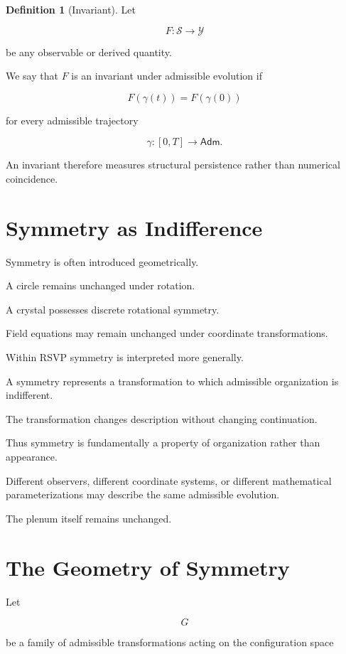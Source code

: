 \documentclass[11pt,oneside]{book}
\numberwithin{equation}{chapter}
\theoremstyle{definition}
\newtheorem{definition}{Definition}[chapter]
\theoremstyle{plain}
\newcommand{\State}{\mathcal{S}}
\newcommand{\Adm}{\mathsf{Adm}}
\begin{document}
\begin{definition}[Invariant]

Let

\[
F:\State\rightarrow\mathcal{Y}
\]

be any observable or derived quantity.

We say that \(F\) is an invariant under admissible evolution if

\[
F(\gamma(t))
=
F(\gamma(0))
\]

for every admissible trajectory

\[
\gamma:[0,T]\rightarrow\Adm.
\]

\end{definition}

An invariant therefore measures structural persistence rather than numerical
coincidence.

\section{Symmetry as Indifference}

Symmetry is often introduced geometrically.

A circle remains unchanged under rotation.

A crystal possesses discrete rotational symmetry.

Field equations may remain unchanged under coordinate transformations.

Within RSVP symmetry is interpreted more generally.

A symmetry represents a transformation to which admissible organization is
indifferent.

The transformation changes description without changing continuation.

Thus symmetry is fundamentally a property of organization rather than
appearance.

Different observers, different coordinate systems, or different
mathematical parameterizations may describe the same admissible evolution.

The plenum itself remains unchanged.

\section{The Geometry of Symmetry}

Let

\[
G
\]

be a family of admissible transformations acting on the configuration space
\end{document}
